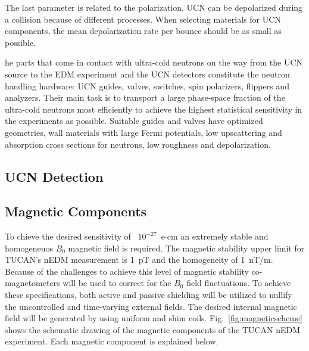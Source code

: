 The last parameter is related to the polarization. UCN can be
depolarized during a collision because of different processes.
When selecting materials for UCN components, the mean depolarization
rate per bounce should be as small as possible.

he parts that come in contact with ultra-cold neutrons on the way from
the UCN source to the EDM experiment and the UCN detectors constitute
the neutron handling hardware: UCN guides, valves, switches, spin
polarizers, flippers and analyzers. Their main task is to transport a
large phase-space fraction of the ultra-cold neutrons most efficiently
to achieve the highest statistical sensitivity in the experiments as
possible.  Suitable guides and valves have optimized geometries, wall
materials with large Fermi potentials, low upscattering and absorption
cross sections for neutrons, low roughness and
depolarization.






\subsection{UCN Detection}













\subsection{Magnetic Components}
To chieve the desired sensitivity of ~$10^{-27}$~e$\cdot$cm an
extremely stable and homogeneuos $B_0$ magnetic field is required. The
magnetic stability upper limit for TUCAN's nEDM measurement is 1~pT
and the homogeneity of 1~nT/m. Because of the challenges to achieve
this level of magnetic stability co-magnetometers will be used to
correct for the $B_0$ field fluctuations. To achieve these
specifications, both active and passive shielding will be utilized to
nullify the uncontrolled and time-varying external fields. The desired
internal magnetic field will be generated by using uniform and shim
coils. Fig.~\ref{fig:magneticscheme} shows the schematic drawing of
the magnetic components of the TUCAN nEDM experiment. Each magnetic
component is explained below.

